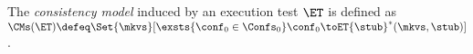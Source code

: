 %

\begin{definition}
\label{def:cm}
The \emph{consistency model} induced by an execution test \(\ET\) is defined as 
\(
\CMs(\ET) \defeq 
\Set{\mkvs}[ 
\exsts{\conf_0 \in \Confs_0}
\conf_0 \toET{\stub}^{*} (\mkvs, \stub)
]
\).
\end{definition}
%

